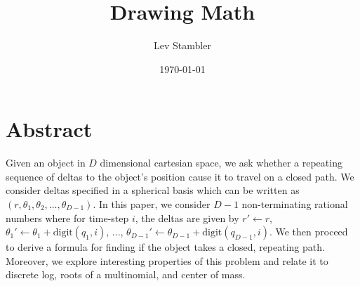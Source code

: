 \documentclass[11pt,titlepage]{article}
\newcommand{\myname}{Lev Stambler}
\begin{document}
\title{Drawing Math}

\author{\myname}

\date{\today}

\maketitle

\pagebreak
\section*{Abstract}
Given an object in $D$ dimensional cartesian space, we ask whether a repeating sequence 
of deltas to the object's position cause it to travel on a closed path.
We consider deltas specified in a spherical basis which can be written as
$\left(r, \theta_1, \theta_2, ..., \theta_{D-1}\right)$.
In this paper, we consider $D-1$ non-terminating
rational numbers where for time-step $i$, the deltas are given by $r' \leftarrow r$, 
$\theta_1' \leftarrow \theta_1 + \mathrm{digit}(q_1, i)$, ..., 
$\theta_{D-1}' \leftarrow \theta_{D-1} + \mathrm{digit}(q_{D-1}, i)$.
We then proceed to derive a formula for finding if the object takes a closed, repeating path.
Moreover, we explore interesting properties of this problem and
relate it to discrete log, roots of a multinomial, and center of mass.
\end{document}
